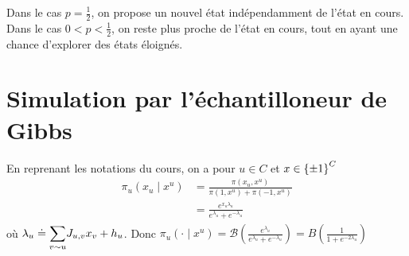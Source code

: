 \documentclass[a4paper,11pt]{article}
\begin{document}
Dans le cas $p=\frac 1 2$, on propose un nouvel état indépendamment de l'état en cours. Dans le cas $0<p<\frac 1 2$, on reste \og plus proche \fg{} de l'état en cours, tout en ayant une chance d'explorer des états éloignés.

\section{Simulation par l'échantilloneur de Gibbs}

En reprenant les notations du cours, on a pour $u \in C$ et $x \in \left\lbrace \pm 1 \right\rbrace^C$
\begin{align*}
\pi_u(x_u \mid x^u)
&= \frac{\pi(x_u,x^u)}{\pi(1,x^u) + \pi(-1,x^u)}\\
&= \frac{e^{x_u \lambda_u}}{e^{\lambda_u} + e^{-\lambda_u}}
\end{align*}
où $\lambda_u \doteq \displaystyle{\sum_{v \sim u}^{}} J_{u,v} x_v + h_u$. Donc $\pi_u(\cdot \mid x^u) = \mathcal B(\frac{e^{\lambda_u}}{e^{\lambda_u} + e^{-\lambda_u}}) = B(\frac{1}{1 + e^{-2\lambda_u}})$
\end{document}
